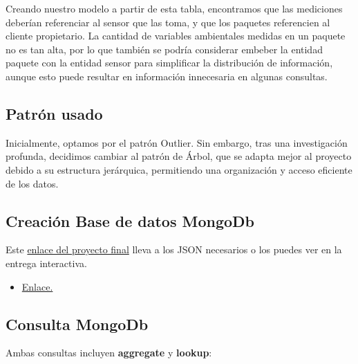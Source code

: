 Creando nuestro modelo a partir de esta tabla, encontramos que las mediciones deberían referenciar al sensor que las toma, y que los paquetes referencien al cliente propietario. La cantidad de variables ambientales medidas en un paquete no es tan alta, por lo que también se podría considerar embeber la entidad paquete con la entidad sensor para simplificar la distribución de información, aunque esto puede resultar en información innecesaria en algunas consultas.

\subsection{Patrón usado}
Inicialmente, optamos por el patrón Outlier. Sin embargo, tras una investigación profunda, decidimos cambiar al patrón de Árbol, que se adapta mejor al proyecto debido a su estructura jerárquica, permitiendo una organización y acceso eficiente de los datos.

\subsection{Creación Base de datos MongoDb}
Este \href{https://eafit-my.sharepoint.com/:f:/g/personal/jayoungh_eafit_edu_co/EuNCT-OUGs5DostAzMy--_YBnfqTibTuUjBO4LGQer7-HA?e=c67An0}{enlace del proyecto final} lleva a los JSON necesarios o los puedes ver en la entrega interactiva.

\begin{itemize}
  \item \href{https://eafit-my.sharepoint.com/:f:/g/personal/jayoungh_eafit_edu_co/EuNCT-OUGs5DostAzMy--_YBnfqTibTuUjBO4LGQer7-HA?e=c67An0}{Enlace.}
\end{itemize}


\subsection{Consulta MongoDb}
Ambas consultas incluyen \textbf{aggregate} y \textbf{lookup}:

